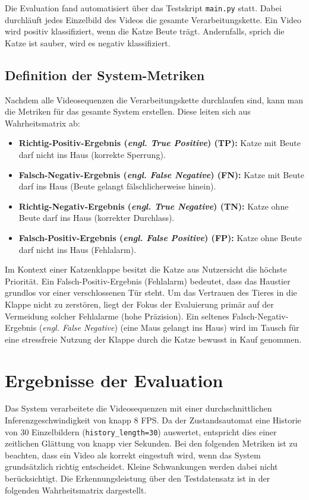 Die Evaluation fand automatisiert über das Testskript \texttt{main.py} statt. Dabei durchläuft jedes Einzelbild des Videos die gesamte Verarbeitungskette. Ein Video wird positiv klassifiziert, wenn die Katze Beute trägt. Andernfalls, sprich die Katze ist sauber, wird es negativ klassifiziert.

\subsection{Definition der System-Metriken}
Nachdem alle Videosequenzen die Verarbeitungskette durchlaufen sind, kann man die Metriken für das gesamte System erstellen. Diese leiten sich aus Wahrheitsmatrix ab:

\begin{itemize}
    \item \textbf{Richtig-Positiv-Ergebnis (\emph{engl. True Positive}) (TP):} Katze mit Beute darf nicht ins Haus (korrekte Sperrung).
    \item \textbf{Falsch-Negativ-Ergebnis (\emph{engl. False Negative}) (FN):} Katze mit Beute darf ins Haus (Beute gelangt fälschlicherweise hinein).
    \item \textbf{Richtig-Negativ-Ergebnis (\emph{engl. True Negative}) (TN):} Katze ohne Beute darf ins Haus (korrekter Durchlass).
    \item \textbf{Falsch-Positiv-Ergebnis (\emph{engl. False Positive}) (FP):} Katze ohne Beute darf nicht ins Haus (Fehlalarm).
\end{itemize}

Im Kontext einer Katzenklappe besitzt die Katze aus Nutzersicht die höchste Priorität. Ein Falsch-Positiv-Ergebnis (Fehlalarm) bedeutet, dass das Haustier grundlos vor einer verschlossenen Tür steht. Um das Vertrauen des Tieres in die Klappe nicht zu zerstören, liegt der Fokus der Evaluierung primär auf der Vermeidung solcher Fehlalarme (hohe Präzision). Ein seltenes Falsch-Negativ-Ergebnis (\emph{engl. False Negative}) (eine Maus gelangt ins Haus) wird im Tausch für eine stressfreie Nutzung der Klappe durch die Katze bewusst in Kauf genommen.

\section{Ergebnisse der Evaluation}
Das System verarbeitete die Videosequenzen mit einer durchschnittlichen Inferenzgeschwindigkeit von knapp 8 FPS. Da der Zustandsautomat eine Historie von 30 Einzelbildern (\texttt{history\_length=30}) auswertet, entspricht dies einer zeitlichen Glättung von knapp vier Sekunden. Bei den folgenden Metriken ist zu beachten, dass ein Video als korrekt eingestuft wird, wenn das System grundsätzlich richtig entscheidet. Kleine Schwankungen werden dabei nicht berücksichtigt. Die Erkennungsleistung über den Testdatensatz ist in der folgenden Wahrheitsmatrix dargestellt.

